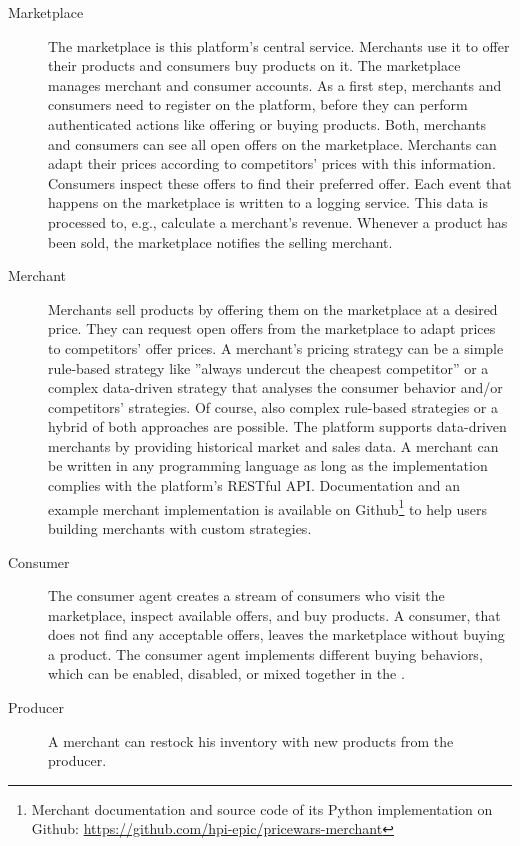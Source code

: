\begin{description}
	\item [Marketplace]
		The marketplace is this platform's central service.
		Merchants use it to offer their products and consumers buy products on it.
		The marketplace manages merchant and consumer accounts.
		As a first step, merchants and consumers need to register on the platform, before they can perform authenticated actions like offering or buying products.
		Both, merchants and consumers can see all open offers on the marketplace.
		Merchants can adapt their prices according to competitors' prices with this information.
		Consumers inspect these offers to find their preferred offer.
		Each event that happens on the marketplace is written to a logging service.
		This data is processed to, e.g., calculate a merchant's revenue.
		Whenever a product has been sold, the marketplace notifies the selling merchant.
	\item [Merchant]
		Merchants sell products by offering them on the marketplace at a desired price.
		They can request open offers from the marketplace to adapt prices to competitors' offer prices.
		A merchant's pricing strategy can be a simple rule-based strategy like ''always undercut the cheapest competitor'' or a complex data-driven strategy that analyses the consumer behavior and/or competitors' strategies.
		Of course, also complex rule-based strategies or a hybrid of both approaches are possible.
		The \pricewars platform supports data-driven merchants by providing historical market and sales data.
		A merchant can be written in any programming language as long as the implementation complies with the platform's RESTful API.
		Documentation and an example merchant implementation is available on Github\footnote{\pricewars Merchant documentation and source code of its Python implementation on Github: \url{https://github.com/hpi-epic/pricewars-merchant}} to help users building merchants with custom strategies.
	\item [Consumer]
		The consumer agent creates a stream of consumers who visit the marketplace, inspect available offers, and buy products.
		A consumer, that does not find any acceptable offers, leaves the marketplace without buying a product.
		The consumer agent implements different buying behaviors, which can be enabled, disabled, or mixed together in the \ui.
	\item [Producer]
		A merchant can restock his inventory with new products from the producer.

\end{description}

